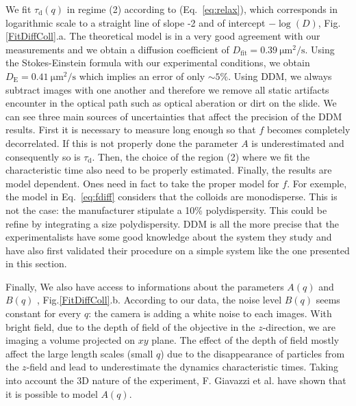 \documentclass[%
 aip,
 jmp,%
 amsmath,amssymb,
reprint,%
]{revtex4-1}
\newcommand{\tg}[1]{{\color{magenta}#1}} %
\begin{document}
We fit $\tau_\text{d}(q)$ in regime (2) according to (Eq.~\ref{eq:relax}), which corresponds in logarithmic scale to a straight line of slope -2 and of intercept $-\log(D)$, Fig.\ref{FitDiffColl}.a. The theoretical model is in a very good agreement with our measurements and we obtain a diffusion coefficient of $D_\text{fit} = \SI{0.39}{\micro\meter\squared\per\second}$. Using the Stokes-Einstein formula with our experimental conditions, we obtain $D_\text{E} = \SI{0.41}{\micro\meter\squared\per\second}$ which implies an error of only $\sim 5 \%$. \tg{Using DDM, we always subtract images with one another and therefore we remove all static artifacts encounter in the optical path such as optical aberation or dirt on the slide. We can see three main sources of uncertainties that affect the precision of the DDM results. First it is necessary to measure long enough so that $f$ becomes completely  decorrelated. If this is not properly done the parameter $A$ is underestimated and consequently so is $\tau_\text{d}$. Then, the choice of the region (2) where we fit the characteristic time also need to be properly estimated. Finally, the results are model dependent. Ones need in fact to take the proper model for $f$. For exemple, the model in Eq.~\eqref{eq:fdiff}  considers that the colloids are monodisperse. This is not the case: the manufacturer stipulate a 10\% polydispersity. This could be refine by integrating a size polydispersity. DDM is all the more precise that the experimentalists have some good knowledge about the system they study and have also first validated their procedure on a simple system like the one presented in this section}.

Finally, We also have access to informations about the parameters $A(q)$ and $B(q)$ , Fig.\ref{FitDiffColl}.b. According to our data, the noise level $B(q)$ seems constant for every $q$: the camera is adding a white noise to each images. With bright field, due to the depth of field of the objective in the $z$-direction, we are imaging a volume projected on $xy$ plane. The effect of the depth of field mostly affect the large length scales (small $q$) due to the disappearance of particles from the $z$-field and lead to underestimate the dynamics characteristic times\cite {4_Martinez20121637}. Taking into account the 3D nature of the experiment,  F. Giavazzi et al.\citep{3_DDM3D} have shown that it is possible to model $A(q)$.
\end{document}
